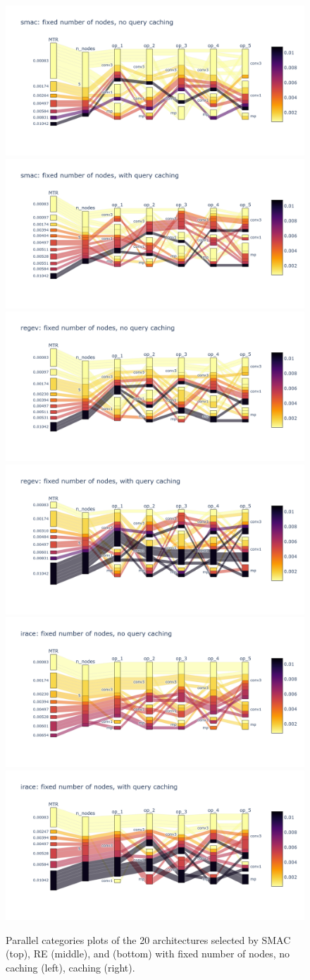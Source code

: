 \begin{figure}
\centering
\includegraphics[width=0.47\linewidth, clip=true, trim=140px 150px 40px 150px]{imgs/parcat/smac-fnn-nc.png}
\includegraphics[width=0.47\linewidth, clip=true, trim=140px 150px 40px 150px]{imgs/parcat/smac-fnn.png}
\includegraphics[width=0.47\linewidth, clip=true, trim=140px 150px 40px 150px]{imgs/parcat/re-fnn-nc.png}
\includegraphics[width=0.47\linewidth, clip=true, trim=140px 150px 40px 150px]{imgs/parcat/re-fnn.png}
\includegraphics[width=0.47\linewidth, clip=true, trim=140px 150px 40px 150px]{imgs/parcat/irace-fnn-nc.png}
\includegraphics[width=0.47\linewidth, clip=true, trim=140px 150px 40px 150px]{imgs/parcat/irace-fnn.png}
\caption{Parallel categories plots of the 20 architectures selected by SMAC (top), RE (middle), and \irace (bottom) with fixed number of nodes, no caching (left), caching (right).}
\label{fig:pc-fnn}
\end{figure}


